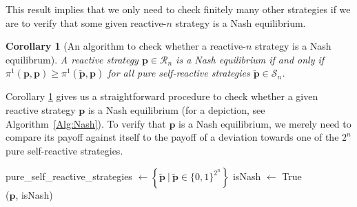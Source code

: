 \documentclass[9pt,twoside,lineno]{pnas-new}
\theoremstyle{plainCl1}
\newtheorem{corollary}{Corollary}
\theoremstyle{plainCl2}
\begin{document}
\noindent
This result implies that we only need to check finitely many other strategies if we are to verify that some given reactive-$n$ strategy is a Nash equilibrium. 

\begin{corollary}[An algorithm to check whether a reactive-$n$ strategy is a Nash equilibrum]
\label{Cor:NashCondition}
A reactive strategy $\mathbf{p}\!\in\!\mathcal{R}_n$ is a Nash equilibrium if and only if $\pi^1(\mathbf{p},\mathbf{p}) \!\ge\! \pi^1(\mathbf{\tilde p},\mathbf{p})$ for all pure self-reactive strategies $\mathbf{\tilde p}\!\in\!\mathcal{S}_n$. 
\end{corollary}

\noindent
Corollary \ref{Cor:NashCondition} gives us a straightforward procedure to check
whether a given reactive strategy $\mathbf{p}$ is a Nash equilibrium (for a
depiction, see Algorithm~\ref{Alg:Nash}). To verify that $\mathbf{p}$ is a Nash
equilibrium, we merely need to compare its payoff against itself to the payoff
of a deviation towards one of the $2^n$ pure self-reactive strategies.\\

\begin{algorithm}[t!]
      pure\_self\_reactive\_strategies $\gets \left\{ \mathbf{\tilde{p}} ~\big|~ \mathbf{\tilde{p}} \in \{0, 1\}^{2 ^ n} \right\}$ \newline
      \hspace*{-.8em} isNash $\gets$ True \\
      \Return (\(\mathbf{p}\), isNash) \;
  \caption{An algorithm to verify whether a given reactive strategy~$\mathbf{p}$ is a Nash equilibrium.}
  \label{Alg:Nash}
\end{algorithm}


\end{document}
